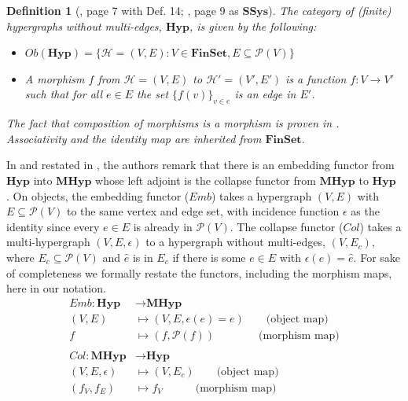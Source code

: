 \documentclass{amsart}
\newtheorem{definition}[theorem]{Definition}
\newcommand{\FinSet}{\mathrm{\textbf{FinSet}}}
\newcommand{\Hyp}{\mathrm{\textbf{Hyp}}}
\newcommand{\MHyp}{\mathrm{\textbf{MHyp}}}
\newcommand{\SSys}{\mathrm{\textbf{SSys}}}
\renewcommand{\H}{\mathcal{H}}
\newcommand{\po}{\mathcal{P}}
\begin{document}
\begin{definition}[\cite{green2025topological}, page 7 with Def. 14; \cite{grilliette2020simplification}, page 9 as $\SSys$]
The category of (finite) hypergraphs without multi-edges, $\Hyp$, is given by the following:
\begin{itemize}
    \item $Ob(\Hyp) = \{\H = (V, E) : V \in \FinSet, E \subseteq \po(V)\}$
    \item A morphism $f$ from $\H=(V, E)$ to $\H'=(V', E')$ is a function $f : V\rightarrow V'$ such that for all $e \in E$ the set $\{f(v)\}_{v \in e}$ is an edge in $E'$.
\end{itemize}
The fact that composition of morphisms is a morphism is proven in \cite[Lemma 1]{green2025topological}. Associativity and the identity map are inherited from $\FinSet$.
\end{definition}

In \cite[Sec. 2.1.2]{grilliette2024simplification} and restated in \cite[Lemma 3]{green2025topological}, the authors remark that there is an embedding functor from $\Hyp$ into $\MHyp$ whose left adjoint is the collapse functor from $\MHyp$ to $\Hyp$ \cite[page 9]{grilliette2020simplification}.
On objects, the embedding functor ($Emb$) takes a hypergraph $(V, E)$ with $E \subseteq \po(V)$ to the same vertex and edge set, with incidence function $\epsilon$ as the identity since every $e \in E$ is already in $\po(V)$.
The collapse functor ($Col$) takes a multi-hypergraph $(V, E, \epsilon)$ to a hypergraph without multi-edges, $(V, E_c)$, where $E_c \subseteq \po(V)$ and $\hat{e}$ is in $E_c$ if there is some $e \in E$ with $\epsilon(e) = \hat{e}$.
For sake of completeness we formally restate the functors, including the morphism maps, here in our notation.
\begin{align*}
    Emb : \Hyp& \rightarrow \MHyp\\
        (V, E)& \mapsto (V, E, \epsilon(e) = e) \hspace{2em} \textrm{(object map)}\\
        f& \mapsto (f, \po(f)) \hspace{4em} \textrm{(morphism map)}\\
        \\
    Col : \MHyp& \rightarrow \Hyp\\
        (V, E, \epsilon)& \mapsto (V, E_c) \hspace{2em} \textrm{(object map)}\\
        (f_V, f_E)& \mapsto f_V \hspace{3em} \textrm{(morphism map)}
\end{align*}
\end{document}
